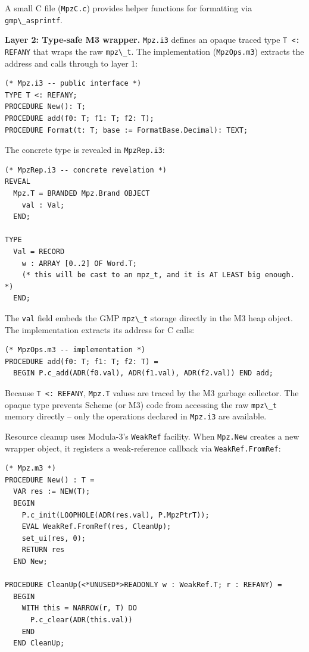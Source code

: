 \documentclass[
  12pt,
]{report}
\newcommand{\passthrough}[1]{#1}
\begin{document}
A small C file (\passthrough{\lstinline!MpzC.c!}) provides helper
functions for formatting via \passthrough{\lstinline!gmp\_asprintf!}.

\textbf{Layer 2: Type-safe M3 wrapper.} \passthrough{\lstinline!Mpz.i3!}
defines an opaque traced type \passthrough{\lstinline!T <: REFANY!} that
wraps the raw \passthrough{\lstinline!mpz\_t!}. The implementation
(\passthrough{\lstinline!MpzOps.m3!}) extracts the address and calls
through to layer 1:

\begin{lstlisting}
(* Mpz.i3 -- public interface *)
TYPE T <: REFANY;
PROCEDURE New(): T;
PROCEDURE add(f0: T; f1: T; f2: T);
PROCEDURE Format(t: T; base := FormatBase.Decimal): TEXT;
\end{lstlisting}

The concrete type is revealed in \passthrough{\lstinline!MpzRep.i3!}:

\begin{lstlisting}
(* MpzRep.i3 -- concrete revelation *)
REVEAL
  Mpz.T = BRANDED Mpz.Brand OBJECT
    val : Val;
  END;

TYPE
  Val = RECORD
    w : ARRAY [0..2] OF Word.T;
    (* this will be cast to an mpz_t, and it is AT LEAST big enough. *)
  END;
\end{lstlisting}

The \passthrough{\lstinline!val!} field embeds the GMP
\passthrough{\lstinline!mpz\_t!} storage directly in the M3 heap object.
The implementation extracts its address for C calls:

\begin{lstlisting}
(* MpzOps.m3 -- implementation *)
PROCEDURE add(f0: T; f1: T; f2: T) =
  BEGIN P.c_add(ADR(f0.val), ADR(f1.val), ADR(f2.val)) END add;
\end{lstlisting}

Because \passthrough{\lstinline!T <: REFANY!},
\passthrough{\lstinline!Mpz.T!} values are traced by the M3 garbage
collector. The opaque type prevents Scheme (or M3) code from accessing
the raw \passthrough{\lstinline!mpz\_t!} memory directly -- only the
operations declared in \passthrough{\lstinline!Mpz.i3!} are available.

Resource cleanup uses Modula-3's \passthrough{\lstinline!WeakRef!}
facility. When \passthrough{\lstinline!Mpz.New!} creates a new wrapper
object, it registers a weak-reference callback via
\passthrough{\lstinline!WeakRef.FromRef!}:

\begin{lstlisting}
(* Mpz.m3 *)
PROCEDURE New() : T =
  VAR res := NEW(T);
  BEGIN
    P.c_init(LOOPHOLE(ADR(res.val), P.MpzPtrT));
    EVAL WeakRef.FromRef(res, CleanUp);
    set_ui(res, 0);
    RETURN res
  END New;

PROCEDURE CleanUp(<*UNUSED*>READONLY w : WeakRef.T; r : REFANY) =
  BEGIN
    WITH this = NARROW(r, T) DO
      P.c_clear(ADR(this.val))
    END
  END CleanUp;
\end{lstlisting}
\end{document}
